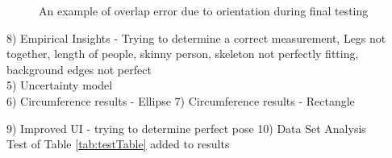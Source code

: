 \begin{figure}[ht]
	\centering
	{%
		\setlength{\fboxsep}{0pt}%
		\setlength{\fboxrule}{0.5pt}%
		}
	\caption{An example of overlap error due to orientation during final testing}
	\label{fig:volunteer1Right}
\end{figure}

8) Empirical Insights - Trying to determine a correct measurement, Legs not together, length of people, skinny person, skeleton not perfectly fitting, background edges not perfect \\

5) Uncertainty model\\

6) Circumference results - Ellipse
7) Circumference results - Rectangle


9) Improved UI - trying to determine perfect pose
10) Data Set Analysis\\

Test of Table \ref{tab:testTable} added to results


